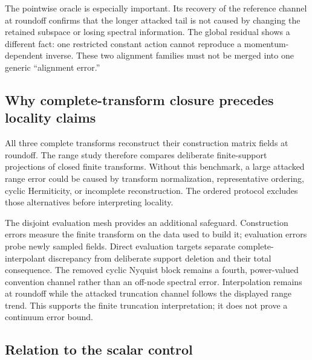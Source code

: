 \documentclass[11pt]{article}
\begin{document}
The pointwise oracle is especially important.  Its recovery of the reference channel at
roundoff confirms that the longer attacked tail is not caused by changing the retained
subspace or losing spectral information.  The global residual shows a different fact:
one restricted constant action cannot reproduce a momentum-dependent inverse.  These two
alignment families must not be merged into one generic ``alignment error.''

\subsection{Why complete-transform closure precedes locality claims}

All three complete transforms reconstruct their construction matrix fields at
roundoff.  The range study therefore compares deliberate finite-support projections of
closed finite transforms.  Without this benchmark, a large attacked range error could
be caused by transform normalization, representative ordering, cyclic Hermiticity, or
incomplete reconstruction.  The ordered protocol excludes those alternatives before
interpreting locality.

The disjoint evaluation mesh provides an additional safeguard.  Construction errors
measure the finite transform on the data used to build it; evaluation errors probe newly
sampled fields.  Direct evaluation targets separate complete-interpolant discrepancy
from deliberate support deletion and their total consequence.  The removed cyclic
Nyquist block remains a fourth, power-valued convention channel rather than an off-node
spectral error.  Interpolation remains at roundoff while the attacked truncation channel
follows the displayed range trend.  This supports the finite truncation interpretation;
it does not prove a continuum error bound.

\subsection{Relation to the scalar control}
\end{document}
